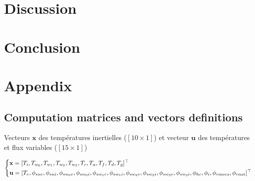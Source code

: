 \documentclass[11pt]{article}
\begin{document}
    

\clearpage
\section{Discussion}
\label{sec:disc}

\clearpage
\section{Conclusion}
\label{sec:conclu}



\clearpage
\printbibliography


\appendix

\clearpage
\section{Appendix} %
\label{sec:appendix}
    
    \subsection{Computation matrices and vectors definitions} %
    \label{sub:computation_matrices_and_vectors_definitions}
    Vecteurs $\mathbf{x}$ des températures inertielles ($[10\times 1]$) et vecteur $\mathbf{u}$ des températures et flux variables ($[15\times 1]$)

    \begin{equation}
          \begin{dcases}
            \mathbf{x} = [T_i, T_{w_0}, T_{w_1}, T_{w_2}, T_{w_3}, T_c, T_u, T_f, T_d, T_g]^\top \\
            \mathbf{u} = [T_e, \phi_{sue}, \phi_{sui}, \phi_{sw_0e}, \phi_{sw_0i}, \phi_{sw_1e}, \phi_{sw_1i}, \phi_{sw_2e}, \phi_{sw_2i}, \phi_{sw_3e}, \phi_{sw_3i}, \phi_{hc}, \phi_{i}, \phi_{v\mathrm{meca}}, \phi_{v\mathrm{nat}}]^\top
          \end{dcases}
        \end{equation}
\end{document}
